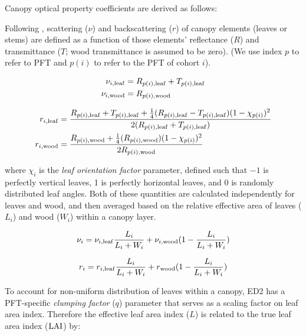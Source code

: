 Canopy optical property coefficients are derived as follows:

Following \citet{clm45_note}, scattering ($\nu$) and backscattering ($r$) of canopy elements (leaves or stems) are defined as a function of those elements' reflectance ($R$) and transmittance ($T$; wood transmittance is assumed to be zero).
(We use index $p$ to refer to PFT and $p(i)$ to refer to the PFT of cohort $i$).

\begin{align}
  \begin{split}
    \nu_{i, \mathrm{leaf}} &= R_{p(i), \mathrm{leaf}} + T_{p(i), \mathrm{leaf}}\\
    \nu_{i, \mathrm{wood}} &= R_{p(i), \mathrm{wood}}\\
  \end{split}
\end{align}

\begin{align}
  \begin{split}
    r_{i, \mathrm{leaf}} &= \frac{R_{p(i), \mathrm{leaf}} + T_{p(i), \mathrm{leaf}} + \frac{1}{4} (R_{p(i), \mathrm{leaf}}-T_{p(i), \mathrm{leaf}})(1 - \chi_{p(i)})^2}{2 (R_{p(i), \mathrm{leaf}}+T_{p(i), \mathrm{leaf}})}\\
    r_{i, \mathrm{wood}} &= \frac{R_{p(i), \mathrm{wood}} + \frac{1}{4} (R_{p(i), \mathrm{wood}})(1 - \chi_{p(i)})^2}{2 R_{p(i), \mathrm{wood}}}
  \end{split}
\end{align}

where $\chi_{i}$ is the \emph{leaf orientation factor} parameter, defined such that $-1$ is perfectly vertical leaves, 1 is perfectly horizontal leaves, and 0 is randomly distributed leaf angles.
Both of these quantities are calculated independently for leaves and wood, and then averaged based on the relative effective area of leaves ($L_{i}$) and wood ($W_{i}$) within a canopy layer.

\begin{equation}
  \nu_{i} = \nu_{i, \mathrm{leaf}} \frac{L_{i}}{L_{i} + W_{i}} + \nu_{i, \mathrm{wood}} (1 - \frac{L_{i}}{L_{i} + W_{i}})
\end{equation}

\begin{equation}
  r_{i} = r_{i, \mathrm{leaf}} \frac{L_{i}}{L_{i} + W_{i}} + r_{\mathrm{wood}} (1 - \frac{L_{i}}{L_{i} + W_{i}})
\end{equation}

To account for non-uniform distribution of leaves within a canopy, ED2 has a PFT-specific \emph{clumping factor} ($q$) parameter that serves as a scaling factor on leaf area index.
Therefore the effective leaf area index ($L$) is related to the true leaf area index ($\mathrm{LAI}$) by:

